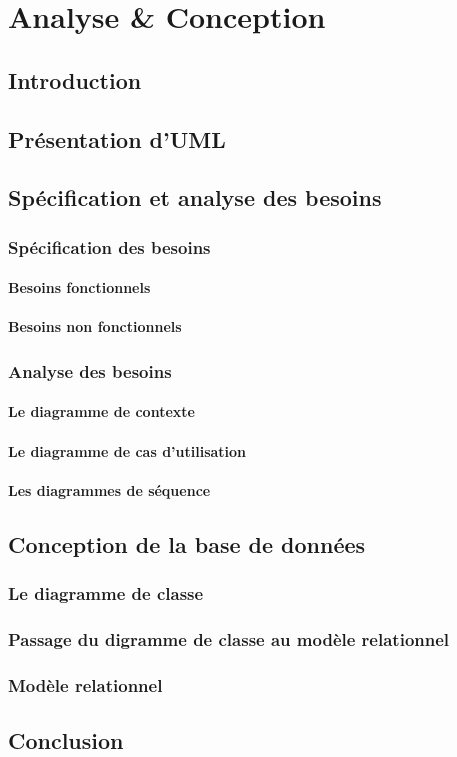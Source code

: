 \chapter{Analyse \& Conception}

\section{Introduction}

\section{Présentation d'UML}

\section{Spécification et analyse des besoins}
    \subsection{Spécification des besoins}
        \subsubsection{Besoins fonctionnels}
        \subsubsection{Besoins non fonctionnels}

    \subsection{Analyse des besoins}
        \subsubsection{Le diagramme de contexte}
        \subsubsection{Le diagramme de cas d'utilisation}
        \subsubsection{Les diagrammes de séquence}
        
        
\section{Conception de la base de données}
    \subsection{Le diagramme de classe}
    \subsection{Passage du digramme de classe au modèle relationnel}
    \subsection{Modèle relationnel}

\section{Conclusion}